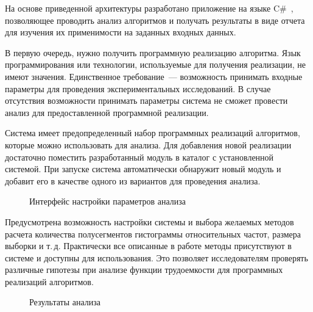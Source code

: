 \documentclass[a4paper, article, 14pt]{extarticle}
\begin{document}
На основе приведенной архитектуры разработано приложение на языке C\#~\cite{system_source}, позволяющее проводить анализ алгоритмов и получать результаты в виде отчета для изучения их применимости на заданных входных данных.

В первую очередь, нужно получить программную реализацию алгоритма. Язык программирования или технологии, используемые для получения реализации, не имеют значения. Единственное требование~--- возможность принимать входные параметры для проведения экспериментальных исследований. В случае отсутствия возможности принимать параметры система не сможет провести анализ для предоставленной программной реализации.

Система имеет предопределенный набор программных реализаций алгоритмов, которые можно использовать для анализа. Для добавления новой реализации достаточно поместить разработанный модуль в каталог с установленной системой. При запуске система автоматически обнаружит новый модуль и добавит его в качестве одного из вариантов для проведения анализа.

\begin{figure}[h]
	\caption{Интерфейс настройки параметров анализа}
	\label{fig:interface}
\end{figure}
\vskip6mm

Предусмотрена возможность настройки системы и выбора желаемых методов расчета количества полусегментов гистограммы относительных частот, размера выборки и т.\,д. Практически все описанные в работе методы присутствуют в системе и доступны для использования. Это позволяет исследователям проверять различные гипотезы при анализе функции трудоемкости для программных реализаций алгоритмов.

\begin{figure}[h]
	\caption{Результаты анализа}
	\label{fig:results}
\end{figure}
\vskip5mm
\end{document}
